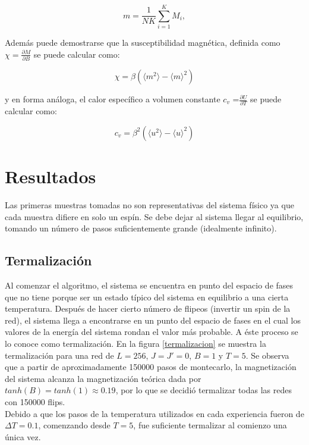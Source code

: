 \documentclass[%
 reprint,
 amsmath,amssymb,
 aps,
spanish]{revtex4-1}
\begin{document}
\begin{equation}
m=\frac{1}{NK}\sum_{i=1}^{K}{M_i},
\label{mmedia}
\end{equation}

Además puede demostrarse que la susceptibilidad magnética, definida como $\chi =\frac{\partial{M}}{\partial{B}}$ se puede calcular como:

\begin{equation}
\chi=\beta \left( \langle m^2 \rangle - \langle m \rangle ^2 \right)
\label{ec:susc}
\end{equation}

y en forma análoga, el calor específico a volumen
constante $c_v$ =$\frac{\partial{U}}{\partial{T}}$ se puede calcular como:

\begin{equation}
c_v = \beta ^2 \left(\langle u^2 \rangle -\langle u \rangle ^2 \right)
\label{ec:calor}
\end{equation}

\section{Resultados}
Las primeras muestras tomadas no son representativas del sistema físico ya que cada muestra difiere en solo
un espín. Se debe dejar al sistema llegar al equilibrio, tomando un número de pasos suficientemente grande (idealmente infinito). 

\subsection{Termalización}
Al comenzar el algoritmo, el sistema se encuentra en punto del espacio de fases que no tiene porque ser un estado típico del sistema en equilibrio a una cierta temperatura. Después de hacer cierto número de flipeos (invertir un spin de la red), el sistema llega a encontrarse 
en un punto del espacio de fases en el cual los valores de la energía del sistema rondan el valor más probable. A éste proceso se lo conoce como termalización. En la figura \ref{termalizacion} se muestra la termalización para una red de $L=256$, $J=J'=0$, $B=1$ y $T=5$. Se observa que a partir de aproximadamente 150000 pasos de montecarlo, la magnetización del sistema alcanza la magnetización teórica dada por $tanh(B)=tanh(1)\approx0.19$, por lo que se decidió termalizar todas las redes con 150000 flips.\\
Debido a que los pasos de la temperatura utilizados en cada experiencia fueron de $\Delta T = 0.1$, comenzando desde $T=5$, fue suficiente termalizar al comienzo una única vez.
\end{document}
